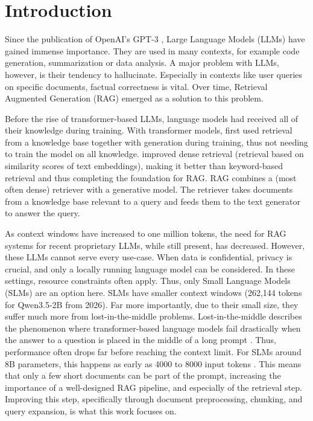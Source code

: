 \documentclass[12pt]{article} %
\begin{document}
\listoftables
\newpage
{}

\section{Introduction}
Since the publication of OpenAI's GPT-3 \parencite{brown2020language}, Large Language Models (LLMs) have gained immense importance. They are used in many contexts, for example code generation, summarization or data analysis. A major problem with LLMs, however, is their tendency to hallucinate. Especially in contexts like user queries on specific documents, factual correctness is vital. Over time, Retrieval Augmented Generation (RAG) emerged as a solution to this problem.

Before the rise of transformer-based LLMs, language models had received all of their knowledge during training. With transformer models, \textcite{guu2020retrieval} first used retrieval from a knowledge base together with generation during training, thus not needing to train the model on all knowledge. \textcite{karpukhin2020dense} improved dense retrieval (retrieval based on similarity scores of text embeddings), making it better than keyword-based retrieval and thus completing the foundation for RAG. RAG \parencite{lewis2020retrieval} combines a (most often dense) retriever with a generative model. The retriever takes documents from a knowledge base relevant to a query and feeds them to the text generator to answer the query.

As context windows have increased to one million tokens, the need for RAG systems for recent proprietary LLMs, while still present, has decreased. However, these LLMs cannot serve every use-case. When data is confidential, privacy is crucial, and only a locally running language model can be considered. In these settings, resource constraints often apply. Thus, only Small Language Models (SLMs) are an option here. SLMs have smaller context windows (262,144 tokens for Qwen3.5-2B from 2026). Far more importantly, due to their small size, they suffer much more from lost-in-the-middle problems. Lost-in-the-middle describes the phenomenon where transformer-based language models fail drastically when the answer to a question is placed in the middle of a long prompt \parencite{liu2024lost}. Thus, performance often drops far before reaching the context limit. For SLMs around 8B parameters, this happens as early as 4000 to 8000 input tokens \parencite{leng2024long}. This means that only a few short documents can be part of the prompt, increasing the importance of a well-designed RAG pipeline, and especially of the retrieval step. Improving this step, specifically through document preprocessing, chunking, and query expansion, is what this work focuses on.
\end{document}
